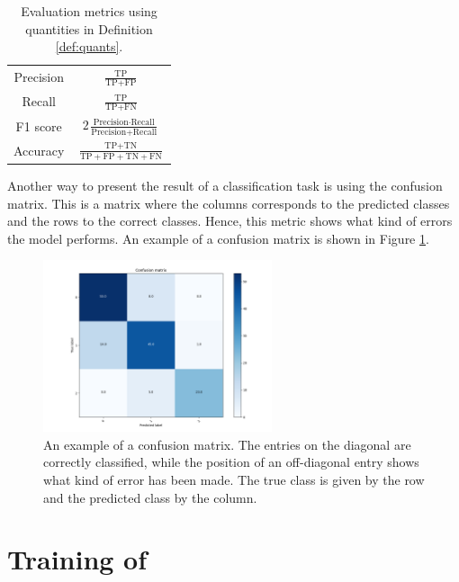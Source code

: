 \begin{table}
 \centering
 \caption{Evaluation metrics using quantities in Definition \ref{def:quants}.}
 \label{tab:eval-metrics}
 {\tabulinesep=1.2mm
 \begin{tabu}{c|c}
   Precision  & $\frac{\text{TP}}{\text{TP} + \text{FP}}$ \\ \hdashline
   Recall     & $\frac{\text{TP}}{\text{TP} + \text{FN}}$ \\ \hdashline
   F1 score   & $2 \frac{\text{Precision} \cdot \text{Recall}}{\text{Precision} + \text{Recall}}$ \\ \hdashline
   Accuracy   & $\frac{\text{TP} + \text{TN}}{\text{TP} + \text{FP} + \text{TN} + \text{FN}}$
 \end{tabu}}
\end{table}

Another way to present the result of a classification task is using the confusion matrix. This is a matrix where the columns corresponds to the predicted classes and the rows to the correct classes. Hence, this metric shows what kind of errors the model performs. An example of a confusion matrix is shown in Figure \ref{fig:conf-example}.

\begin{figure}
  \centering
  \includegraphics[width=0.6\textwidth]{files/figs/conf-example.png}
  \caption{An example of a confusion matrix. The entries on the diagonal are correctly classified, while the position of an off-diagonal entry shows what kind of error has been made. The true class is given by the row and the predicted class by the column.}
  \label{fig:conf-example}
\end{figure}


\section{Training of }

